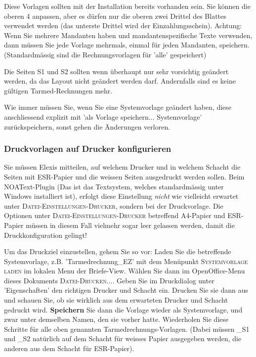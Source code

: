 \documentclass[a4paper]{scrartcl}
\begin{document}
\medskip

Diese Vorlagen sollten mit der Installation bereits vorhanden sein. Sie können die oberen 4 anpassen, aber es dürfen nur die oberen zwei Drittel des Blattes verwendet werden (das unterste Drittel wird der Einzahlungsschein). Achtung: Wenn Sie mehrere Mandanten haben und mandantenspezifische Texte verwenden, dann müssen Sie jede Vorlage mehrmals, einmal für jeden Mandanten, speichern. (Standardmässig sind die Rechnungsvorlagen für 'alle' gespeichert)

Die Seiten S1 und S2 sollten wenn überhaupt nur sehr vorsichtig geändert werden, da das Layout nicht geändert werden darf. Andernfalls sind es keine gültigen Tarmed-Rechnungen mehr.

Wie immer müssen Sie, wenn Sie eine Systemvorlage geändert haben, diese anschliessend explizit mit 'als Vorlage speichern... Systemvorlage' zurückspeichern, sonst gehen die Änderungen verloren.

\subsubsection{Druckvorlagen auf Drucker konfigurieren}
\label{druckkonfiguration}
Sie müssen Elexis mitteilen, auf welchem Drucker und in welchem Schacht die Seiten mit ESR-Papier und die weissen Seiten ausgedruckt werden sollen. Beim NOAText-Plugin (Das ist das Textsystem, welches standardmässig unter Windows installiert ist), erfolgt diese Einstellung \textit{nicht} wie vielleicht erwartet unter \textsc{Datei-Einstellungen-Drucker}, sondern bei der Druckvorlage. Die Optionen unter \textsc{Datei-Einstellungen-Drucker} betreffend A4-Papier und ESR-Papier müssen in diesem Fall vielmehr sogar leer gelassen werden, damit die Druckkonfiguration gelingt!

\medskip

Um das Druckziel einzustellen, gehem Sie so vor: Laden Sie die betreffende Systemvorlage, z.B. 'Tarmedrechnung\_EZ' mit dem Menüpunkt \textsc{Systemvorlage laden} im lokalen Menu der Briefe-View. Wählen Sie dann im OpenOffice-Menu dieses Dokuments \textsc{Datei-Drucken...}. Geben Sie im Druckdialog unter 'Eigenschaften' den richtigen Drucker und Schacht ein.  Drucken Sie sie dann aus und schauen Sie, ob sie wirklich aus dem erwarteten Drucker und Schacht gedruckt wird. \textbf{Speichern} Sie dann die Vorlage wieder als Systemvorlage, und zwar unter demselben Namen, den sie vorher hatte. Wiederholen Sie diese Schritte für alle oben genannten Tarmedrechnungs-Vorlagen. (Dabei müssen \_S1 und \_S2 natürlich auf dem Schacht für weisses Papier ausgegeben werden, die anderen aus dem Schacht für ESR-Papier).
\end{document}
